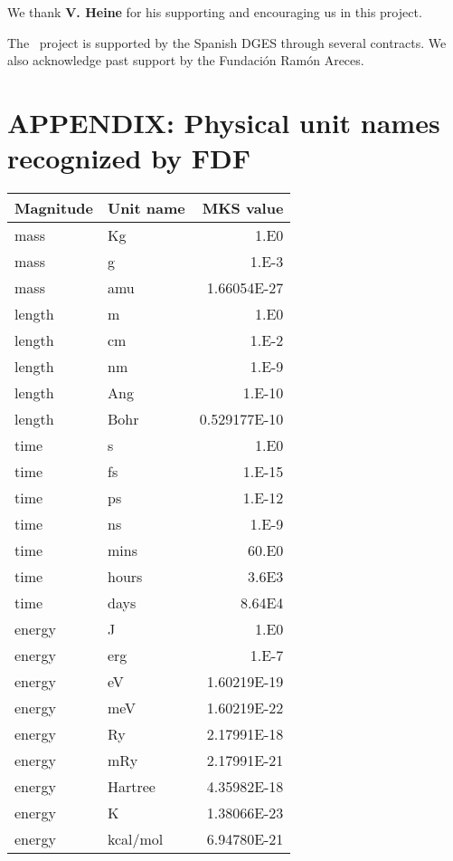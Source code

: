 We thank \textbf{V. Heine} for his supporting and encouraging us in this
project.

The \siesta\ project is supported by the Spanish DGES through
several contracts. We also acknowledge past support by the Fundaci\'on
Ram\'on Areces.



\section{APPENDIX: Physical unit names recognized by FDF}

\begin{center}
\begin{tabular}{llr}
Magnitude & Unit name & MKS value \\
\hline
mass     & Kg         & 1.E0 \\
mass     & g          & 1.E-3 \\
mass     & amu        & 1.66054E-27 \\
length   & m          & 1.E0 \\
length   & cm         & 1.E-2 \\
length   & nm         & 1.E-9 \\
length   & Ang        & 1.E-10 \\
length   & Bohr       & 0.529177E-10 \\
time     & s          & 1.E0 \\
time     & fs         & 1.E-15 \\
time     & ps         & 1.E-12 \\
time     & ns         & 1.E-9 \\
time     & mins       & 60.E0 \\
time     & hours      & 3.6E3 \\
time     & days       & 8.64E4 \\
energy   & J          & 1.E0 \\
energy   & erg        & 1.E-7 \\
energy   & eV         & 1.60219E-19 \\
energy   & meV        & 1.60219E-22 \\
energy   & Ry         & 2.17991E-18 \\
energy   & mRy        & 2.17991E-21 \\
energy   & Hartree    & 4.35982E-18 \\
energy   & K          & 1.38066E-23 \\
energy   & kcal/mol   & 6.94780E-21 \\

\end{tabular}
\end{center}
